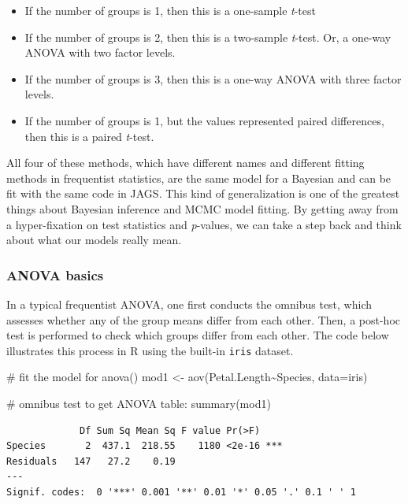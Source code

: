 \documentclass[
  13,
  letterpaper,
]{report}
\newenvironment{Shaded}{\begin{snugshade}}{\end{snugshade}}
\newcommand{\AttributeTok}[1]{\textcolor[rgb]{0.40,0.45,0.13}{#1}}
\newcommand{\CommentTok}[1]{\textcolor[rgb]{0.37,0.37,0.37}{#1}}
\newcommand{\FunctionTok}[1]{\textcolor[rgb]{0.28,0.35,0.67}{#1}}
\newcommand{\NormalTok}[1]{\textcolor[rgb]{0.00,0.23,0.31}{#1}}
\newcommand{\OtherTok}[1]{\textcolor[rgb]{0.00,0.23,0.31}{#1}}
\newcommand{\SpecialCharTok}[1]{\textcolor[rgb]{0.37,0.37,0.37}{#1}}
\providecommand{\tightlist}{%
  \setlength{\itemsep}{0pt}\setlength{\parskip}{0pt}}
\begin{document}
\begin{itemize}
\tightlist
\item
  If the number of groups is 1, then this is a one-sample \emph{t}-test
\item
  If the number of groups is 2, then this is a two-sample \emph{t}-test.
  Or, a one-way ANOVA with two factor levels.
\item
  If the number of groups is 3, then this is a one-way ANOVA with three
  factor levels.
\item
  If the number of groups is 1, but the values represented paired
  differences, then this is a paired \emph{t}-test.
\end{itemize}

All four of these methods, which have different names and different
fitting methods in frequentist statistics, are the same model for a
Bayesian and can be fit with the same code in JAGS. This kind of
generalization is one of the greatest things about Bayesian inference
and MCMC model fitting. By getting away from a hyper-fixation on test
statistics and \emph{p}-values, we can take a step back and think about
what our models really mean.

\subsubsection{ANOVA basics}\label{anova-basics}

In a typical frequentist ANOVA, one first conducts the omnibus test,
which assesses whether any of the group means differ from each other.
Then, a post-hoc test is performed to check which groups differ from
each other. The code below illustrates this process in R using the
built-in \texttt{iris} dataset.

\begin{Shaded}
\begin{Highlighting}[]
\CommentTok{\# fit the model for anova()}
\NormalTok{mod1 }\OtherTok{\textless{}{-}} \FunctionTok{aov}\NormalTok{(Petal.Length}\SpecialCharTok{\textasciitilde{}}\NormalTok{Species, }\AttributeTok{data=}\NormalTok{iris)}

\CommentTok{\# omnibus test to get ANOVA table:}
\FunctionTok{summary}\NormalTok{(mod1)}
\end{Highlighting}
\end{Shaded}

\begin{verbatim}
             Df Sum Sq Mean Sq F value Pr(>F)    
Species       2  437.1  218.55    1180 <2e-16 ***
Residuals   147   27.2    0.19                   
---
Signif. codes:  0 '***' 0.001 '**' 0.01 '*' 0.05 '.' 0.1 ' ' 1
\end{verbatim}
\end{document}
